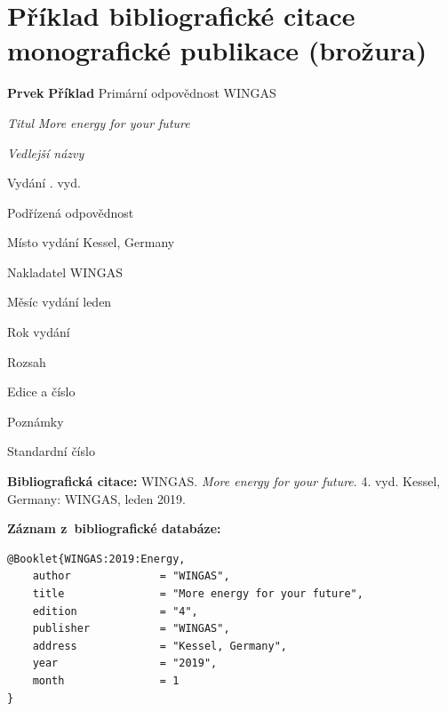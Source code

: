
\newpage
\section*{Příklad bibliografické citace monografické publikace (brožura)}
\label{pr-monografie3}
\begin{tabbing}
\zarazky
\textbf{Prvek} \> \textbf{Příklad} \odradkovani
Primární odpovědnost \>
WINGAS

\odradkovani
{\em Titul} \>
{\em More energy for your future}

\odradkovani
{\em Vedlejší názvy}\footnotemark[1]

\odradkovani
Vydání . vyd.

\odradkovani
Podřízená odpovědnost\footnotemark[1] \>

\odradkovani
Místo vydání \>
Kessel, Germany

\odradkovani
Nakladatel \>
WINGAS

\odradkovani
Měsíc vydání \>
leden

\odradkovani
Rok vydání 

\odradkovani
Rozsah\footnotemark[1] \>

\odradkovani
Edice a číslo \>

\odradkovani
Poznámky\footnotemark[2] \>

\odradkovani
Standardní číslo \>

\odradkovani
\end{tabbing}

\noindent \textbf{Bibliografická citace:} \odradkovani
{\sc WINGAS}. {\em More energy for your future}. 4. vyd. Kessel, Germany: WINGAS, leden 2019.

\bigskip \bigskip
\noindent \textbf{Záznam z~bibliografické databáze:}
\vspace{-0.5em}
\begin{verbatim}
@Booklet{WINGAS:2019:Energy,
    author              = "WINGAS",
    title               = "More energy for your future",
    edition             = "4",
    publisher           = "WINGAS",
    address             = "Kessel, Germany",
    year                = "2019",
    month               = 1
}
\end{verbatim}

